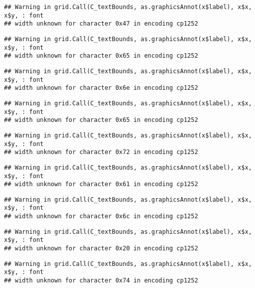 \documentclass[
]{article}
\begin{document}
\begin{verbatim}
## Warning in grid.Call(C_textBounds, as.graphicsAnnot(x$label), x$x, x$y, : font
## width unknown for character 0x47 in encoding cp1252
\end{verbatim}

\begin{verbatim}
## Warning in grid.Call(C_textBounds, as.graphicsAnnot(x$label), x$x, x$y, : font
## width unknown for character 0x65 in encoding cp1252
\end{verbatim}

\begin{verbatim}
## Warning in grid.Call(C_textBounds, as.graphicsAnnot(x$label), x$x, x$y, : font
## width unknown for character 0x6e in encoding cp1252
\end{verbatim}

\begin{verbatim}
## Warning in grid.Call(C_textBounds, as.graphicsAnnot(x$label), x$x, x$y, : font
## width unknown for character 0x65 in encoding cp1252
\end{verbatim}

\begin{verbatim}
## Warning in grid.Call(C_textBounds, as.graphicsAnnot(x$label), x$x, x$y, : font
## width unknown for character 0x72 in encoding cp1252
\end{verbatim}

\begin{verbatim}
## Warning in grid.Call(C_textBounds, as.graphicsAnnot(x$label), x$x, x$y, : font
## width unknown for character 0x61 in encoding cp1252
\end{verbatim}

\begin{verbatim}
## Warning in grid.Call(C_textBounds, as.graphicsAnnot(x$label), x$x, x$y, : font
## width unknown for character 0x6c in encoding cp1252
\end{verbatim}

\begin{verbatim}
## Warning in grid.Call(C_textBounds, as.graphicsAnnot(x$label), x$x, x$y, : font
## width unknown for character 0x20 in encoding cp1252
\end{verbatim}

\begin{verbatim}
## Warning in grid.Call(C_textBounds, as.graphicsAnnot(x$label), x$x, x$y, : font
## width unknown for character 0x74 in encoding cp1252
\end{verbatim}
\end{document}
